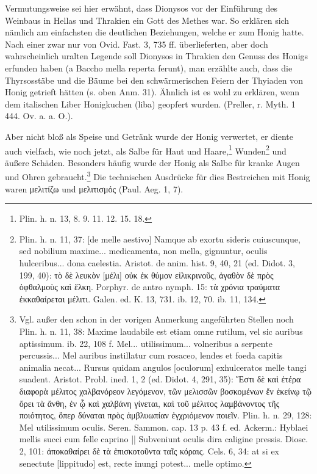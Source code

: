 \documentclass[a4paper, 11pt, oneside]{article}
\begin{document}
Vermutungsweise sei hier erwähnt, dass Dionysos vor der Einführung des Weinbaus in Hellas und Thrakien ein Gott des Methes war. So erklären sich nämlich am einfachsten die deutlichen Beziehungen, welche er zum Honig hatte. Nach einer zwar nur von Ovid. Fast. 3, 735 ff. überlieferten, aber doch wahrscheinlich uralten Legende soll Dionysos in Thrakien den Genuss des Honigs erfunden haben (a Baccho mella reperta ferunt), man erzählte auch, dass die Thyrsosstäbe und die Bäume bei den schwärmerischen Feiern der Thyiaden von Honig getrieft hätten (s. oben Anm. 31). Ähnlich ist es wohl zu erklären, wenn dem italischen Liber Honigkuchen (liba) geopfert wurden. (Preller, r. Myth. 1 444. Ov. a. a. O.).

Aber nicht bloß als Speise und Getränk wurde der Honig verwertet, er diente auch vielfach, wie noch jetzt, als Salbe für Haut und Haare,\footnote{Plin. h. n. 13, 8. 9. 11. 12. 15. 18.} Wunden\footnote{Plin. h. n. 11, 37: [de melle aestivo] Namque ab exortu sideris cuiuscunque, sed nobilium maxime... medicamenta, non mella, gignuntur, oculis hulceribus... dona caelestia. Aristot. de anim. hist. 9, 40, 21 (ed. Didot. 3, 199, 40): τὸ δὲ λευκὸν [μέλι] οὐκ ἐκ θύμον εἰλικρινοῦς, ἀγαθὸν δὲ πρὸς ὀφθαλμοὺς καὶ ἕλκη. Porphyr. de antro nymph. 15: τὰ χρόνια τραύματα ἐκκαθαίρεται μέλιτι. Galen. ed. K. 13, 731. ib. 12, 70. ib. 11, 134.} und äußere Schäden. Besonders häufig wurde der Honig als Salbe für kranke Augen und Ohren gebraucht.\footnote{Vgl. außer den schon in der vorigen Anmerkung angeführten Stellen noch Plin. h. n. 11, 38: Maxime laudabile est etiam omne rutilum, vel sic auribus aptissimum. ib. 22, 108 f. Mel... utilissimum... volneribus a serpente percussis... Mel auribus instillatur cum rosaceo, lendes et foeda capitis animalia necat... Rursus quidam angulos [oculorum] exhulceratos melle tangi suadent. Aristot. Probl. ined. 1, 2 (ed. Didot. 4, 291, 35): Ἔστι δὲ καὶ ἑτέρα διαφορὰ μέλιτος χαλβανόρεον λεγόμενον, τῶν μελισσῶν βοσκομένων ἕν ἐκείνῳ τῷ ὄρει τὰ ἄνθη, ἐν ᾧ καὶ χαλβάνη γίνεται, καὶ τοῦ μέλιτος λαμβάνοντος τῆς ποιότητος, ὅπερ δύναται πρὸς ἀμβλυωπίαν ἐγχριόμενον ποιεῖν. Plin. h. n. 29, 128: Mel utilissimum oculis. Seren. Sammon. cap. 13 p. 43 f. ed. Ackerm.: Hyblaei mellis succi cum felle caprino || Subveniunt oculis dira caligine pressis. Diosc. 2, 101: ἀποκαθαίρει δὲ τὰ ἐπισκοτοῦντα ταῖς κόραις. Cels. 6, 34: at si ex senectute [lippitudo] est, recte inungi potest... melle optimo.} Die technischen Ausdrücke für dies Bestreichen mit Honig waren μελιτίζω und μελιτισμός (Paul. Aeg. 1, 7).
\end{document}
